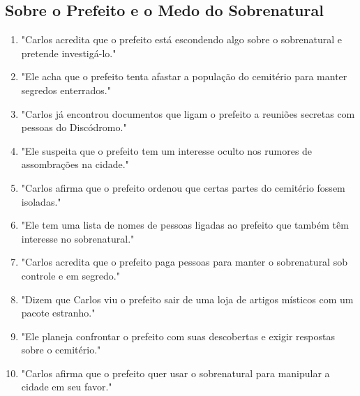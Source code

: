 \subsection*{Sobre o Prefeito e o Medo do Sobrenatural}
\begin{enumerate}
    \item "Carlos acredita que o prefeito está escondendo algo sobre o sobrenatural e pretende investigá-lo."
    \item "Ele acha que o prefeito tenta afastar a população do cemitério para manter segredos enterrados."
    \item "Carlos já encontrou documentos que ligam o prefeito a reuniões secretas com pessoas do Discódromo."
    \item "Ele suspeita que o prefeito tem um interesse oculto nos rumores de assombrações na cidade."
    \item "Carlos afirma que o prefeito ordenou que certas partes do cemitério fossem isoladas."
    \item "Ele tem uma lista de nomes de pessoas ligadas ao prefeito que também têm interesse no sobrenatural."
    \item "Carlos acredita que o prefeito paga pessoas para manter o sobrenatural sob controle e em segredo."
    \item "Dizem que Carlos viu o prefeito sair de uma loja de artigos místicos com um pacote estranho."
    \item "Ele planeja confrontar o prefeito com suas descobertas e exigir respostas sobre o cemitério."
    \item "Carlos afirma que o prefeito quer usar o sobrenatural para manipular a cidade em seu favor."
\end{enumerate}

